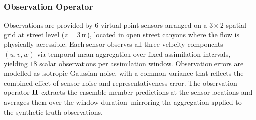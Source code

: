 \subsubsection{Observation Operator}
\label{sec:obs}

Observations are provided by $6$ virtual point sensors arranged on a $3 \times 2$
spatial grid at street level ($z = 3\,\mathrm{m}$), located in open street
canyons where the flow is physically accessible. Each sensor observes all
three velocity components $(u, v, w)$ via temporal mean aggregation over fixed
assimilation intervals, yielding $18$ scalar observations per assimilation window.
Observation errors are modelled as isotropic Gaussian noise, with a common
variance that reflects the combined effect of sensor noise and representativeness
error. The observation operator $\mathbf{H}$ extracts the ensemble-member
predictions at the sensor locations and averages them over the window duration,
mirroring the aggregation applied to the synthetic truth observations.
